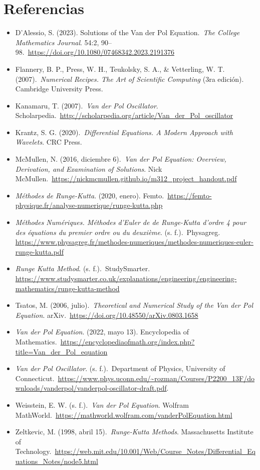 \section{Referencias}

\begin{itemize}
	\item D'Alessio, S. (2023). Solutions of the Van der Pol Equation.\ \textit{The College Mathematics Journal}. 54:2, 90–98.\ \url{https://doi.org/10.1080/07468342.2023.2191376}
	\item Flannery, B. P., Press, W. H., Teukolsky, S. A., \& Vetterling, W. T. (2007).\ \textit{Numerical Recipes. The Art of Scientific Computing} (3ra edición). Cambridge University Press.
	\item Kanamaru, T. (2007).\ \textit{Van der Pol Oscillator}. Scholarpedia.\ \url{http://scholarpedia.org/article/Van_der_Pol_oscillator}
	\item Krantz, S. G. (2020).\ \textit{Differential Equations. A Modern Approach with Wavelets}. CRC Press.
	\item McMullen, N. (2016, diciembre 6).\ \textit{Van der Pol Equation: Overview, Derivation, and Examination of Solutions}. Nick McMullen.\ \url{https://nickmcmullen.github.io/m312_project_handout.pdf}
	\item \textit{Méthodes de Runge-Kutta}. (2020, enero). Femto.\ \url{https://femto-physique.fr/analyse-numerique/runge-kutta.php}
	\item \textit{Méthodes Numériques. Méthodes d'Euler de de Runge-Kutta d'ordre 4 pour des équations du premier ordre ou du deuxième}. (s. f.).\ Physagreg. \url{https://www.physagreg.fr/methodes-numeriques/methodes-numeriques-euler-runge-kutta.pdf}
	\item \textit{Runge Kutta Method}. (s. f.).\ StudySmarter. \url{https://www.studysmarter.co.uk/explanations/engineering/engineering-mathematics/runge-kutta-method}
	\item Tsatos, M. (2006, julio).\ \textit{Theoretical and Numerical Study of the Van der Pol Equation}. arXiv.\ \url{https://doi.org/10.48550/arXiv.0803.1658}
	\item \textit{Van der Pol Equation}. (2022, mayo 13). Encyclopedia of Mathematics.\ \url{https://encyclopediaofmath.org/index.php?title=Van_der_Pol_equation}
	\item \textit{Van der Pol Oscillator}. (s. f.).\ Department of Physics, University of Connecticut.\ \url{https://www.phys.uconn.edu/~rozman/Courses/P2200_13F/downloads/vanderpol/vanderpol-oscillator-draft.pdf}.
	\item Weisstein, E. W. (s. f.).\ \textit{Van der Pol Equation}. Wolfram MathWorld.\ \url{https://mathworld.wolfram.com/vanderPolEquation.html}
	\item Zeltkevic, M. (1998, abril 15).\ \textit{Runge-Kutta Methods}. Massachusetts Institute of Technology.\ \url{https://web.mit.edu/10.001/Web/Course_Notes/Differential_Equations_Notes/node5.html}
\end{itemize}
